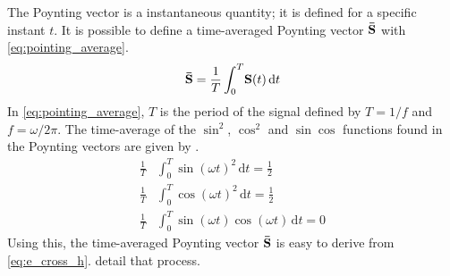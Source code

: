 The Poynting vector is a instantaneous quantity; it is defined for a specific instant $t$.
It is possible to define a time-averaged Poynting vector $\mathbf{\bar{S}}$ with \cref{eq:pointing_average}.
\begin{equation}
    \mathbf{\bar{S}} = \frac{1}{T}
    \int_0^T \! \mathbf{S}(t)\, \mathrm{d}t
    \label{eq:pointing_average}
\end{equation}
In \cref{eq:pointing_average}, $T$ is the period of the signal defined by $T=1/f$ and $f=\omega/2\pi$.
The time-average of the $\sin^2$, $\cos^2$ and $\sin\cos$ functions found in the Poynting vectors are given by .
\begin{subequations}
    \begin{align}
        \frac{1}{T} &\int_0^{T} \! \sin(\omega t)^2 \, \mathrm{d}t = \frac{1}{2}
        \label{eq:trig_average_ss}
        \\
        \frac{1}{T} &\int_0^{T} \! \cos(\omega t)^2 \, \mathrm{d}t = \frac{1}{2}
        \label{eq:trig_average_cc}
        \\
        \frac{1}{T} &\int_0^{T} \! \sin(\omega t)\cos(\omega t) \, \mathrm{d}t = 0
        \label{eq:trig_average_sc}
    \end{align}
    \label{eq:trig_average}
\end{subequations}
Using this, the time-averaged Poynting vector $\mathbf{\bar{S}}$ is easy to derive from \cref{eq:e_cross_h}.
 detail that process.
